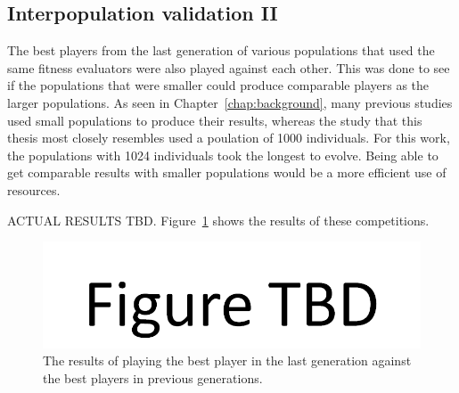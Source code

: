 \subsection{Interpopulation validation II}

The best players from the last generation of various populations that used
the same fitness evaluators were also played against each other. This was done
to see if the populations that were smaller could produce comparable
players as the larger populations. As seen in Chapter~\ref{chap:background},
many previous studies used small populations to produce their results, whereas
the study that this thesis most closely resembles used a poulation of 1000
individuals. For this work, the populations with 1024 individuals took the
longest to evolve. Being able to get comparable results with smaller populations
would be a more efficient use of resources.

ACTUAL RESULTS TBD. Figure~\ref{figure-interpopulation2} shows the results of
these competitions.

\begin{figure}[htp]
\centerline{\includegraphics[width=0.75\columnwidth]{Figures/figureTBD.png}}
\caption[Validation - Comparing population sizes]{The results of playing the
best player in the last generation against the best players in previous
generations.}
\label{figure-interpopulation2}
\end{figure}

